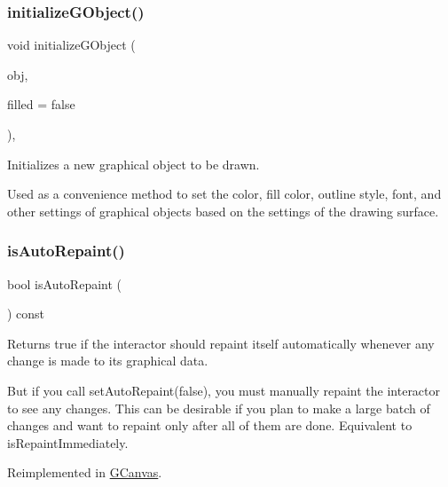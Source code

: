 \subsubsection{\texorpdfstring{initialize\+G\+Object()}{initializeGObject()}\hspace{0.1cm}{\footnotesize\ttfamily [2/2]}}
{\footnotesize\ttfamily void initialize\+G\+Object (\begin{DoxyParamCaption}\item[{\mbox{\hyperlink{classGObject}{G\+Object}} $\ast$}]{obj,  }\item[{bool}]{filled = {\ttfamily false} }\end{DoxyParamCaption})\hspace{0.3cm}{\ttfamily [protected]}, {\ttfamily [virtual]}}



Initializes a new graphical object to be drawn. 

Used as a convenience method to set the color, fill color, outline style, font, and other settings of graphical objects based on the settings of the drawing surface. \mbox{\label{classGDrawingSurface_a12c8d52ddfcaa5448ec4bace92ddee6c}} 
\subsubsection{\texorpdfstring{is\+Auto\+Repaint()}{isAutoRepaint()}}
{\footnotesize\ttfamily bool is\+Auto\+Repaint (\begin{DoxyParamCaption}{ }\end{DoxyParamCaption}) const\hspace{0.3cm}{\ttfamily [virtual]}}



Returns true if the interactor should repaint itself automatically whenever any change is made to its graphical data. 

But if you call set\+Auto\+Repaint(false), you must manually repaint the interactor to see any changes. This can be desirable if you plan to make a large batch of changes and want to repaint only after all of them are done. Equivalent to is\+Repaint\+Immediately. 

Reimplemented in \mbox{\hyperlink{classGCanvas_aa0b3b78666686fcd2a5b33a20febef0f}{G\+Canvas}}.


